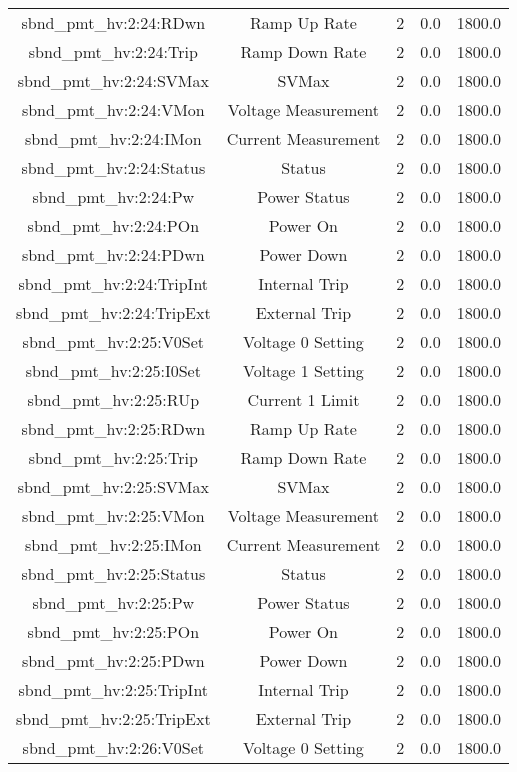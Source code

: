 \begin{table}[ptb]
\begin{tabular}{c | c c c c}
sbnd_pmt_hv:2:24:RDwn & Ramp Up Rate & 2 & 0.0 & 1800.0\\ 
sbnd_pmt_hv:2:24:Trip & Ramp Down Rate & 2 & 0.0 & 1800.0\\ 
sbnd_pmt_hv:2:24:SVMax & SVMax & 2 & 0.0 & 1800.0\\ 
sbnd_pmt_hv:2:24:VMon & Voltage Measurement & 2 & 0.0 & 1800.0\\ 
sbnd_pmt_hv:2:24:IMon & Current Measurement & 2 & 0.0 & 1800.0\\ 
sbnd_pmt_hv:2:24:Status & Status & 2 & 0.0 & 1800.0\\ 
sbnd_pmt_hv:2:24:Pw & Power Status & 2 & 0.0 & 1800.0\\ 
sbnd_pmt_hv:2:24:POn & Power On & 2 & 0.0 & 1800.0\\ 
sbnd_pmt_hv:2:24:PDwn & Power Down & 2 & 0.0 & 1800.0\\ 
sbnd_pmt_hv:2:24:TripInt & Internal Trip & 2 & 0.0 & 1800.0\\ 
sbnd_pmt_hv:2:24:TripExt & External Trip & 2 & 0.0 & 1800.0\\ 
sbnd_pmt_hv:2:25:V0Set & Voltage 0 Setting & 2 & 0.0 & 1800.0\\ 
sbnd_pmt_hv:2:25:I0Set & Voltage 1 Setting & 2 & 0.0 & 1800.0\\ 
sbnd_pmt_hv:2:25:RUp & Current 1 Limit & 2 & 0.0 & 1800.0\\ 
sbnd_pmt_hv:2:25:RDwn & Ramp Up Rate & 2 & 0.0 & 1800.0\\ 
sbnd_pmt_hv:2:25:Trip & Ramp Down Rate & 2 & 0.0 & 1800.0\\ 
sbnd_pmt_hv:2:25:SVMax & SVMax & 2 & 0.0 & 1800.0\\ 
sbnd_pmt_hv:2:25:VMon & Voltage Measurement & 2 & 0.0 & 1800.0\\ 
sbnd_pmt_hv:2:25:IMon & Current Measurement & 2 & 0.0 & 1800.0\\ 
sbnd_pmt_hv:2:25:Status & Status & 2 & 0.0 & 1800.0\\ 
sbnd_pmt_hv:2:25:Pw & Power Status & 2 & 0.0 & 1800.0\\ 
sbnd_pmt_hv:2:25:POn & Power On & 2 & 0.0 & 1800.0\\ 
sbnd_pmt_hv:2:25:PDwn & Power Down & 2 & 0.0 & 1800.0\\ 
sbnd_pmt_hv:2:25:TripInt & Internal Trip & 2 & 0.0 & 1800.0\\ 
sbnd_pmt_hv:2:25:TripExt & External Trip & 2 & 0.0 & 1800.0\\ 
sbnd_pmt_hv:2:26:V0Set & Voltage 0 Setting & 2 & 0.0 & 1800.0\\ 

\end{tabular}
\end{table}

